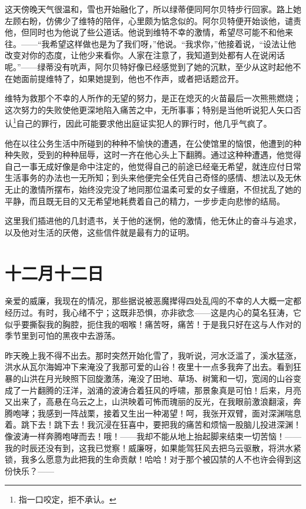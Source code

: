 \documentclass[12pt,oneside]{book}
\begin{document}
\begin{framed}
这天傍晚天气很温和，雪也开始融化了，所以绿蒂便同阿尔贝特步行回家。路上她左顾右盼，仿佛少了维特的陪伴，心里颇为惦念似的。阿尔贝特便开始谈他，谴责他，但同时也为他说了些公道话。他说到维特不幸的激情，希望尽可能不和他来往。——“我希望这样做也是为了我们呀，”他说。“我求你，”他接着说，“设法让他改变对你的态度，让他少来看你。人家在注意了，我知道到处都有人在说闲话呢。”——绿蒂没有吭声，阿尔贝特好像已经感觉到了她的沉默，至少从这时起他不在她面前提维特了，如果她提到，他也不作声，或者把话题岔开。

维特为救那个不幸的人所作的无望的努力，是正在熄灭的火苗最后一次熊熊燃烧；这次努力的失败使他更深地陷入痛苦之中，无所事事；特别是当他听说犯人矢口否认\footnote{指一口咬定，拒不承认。}自己的罪行，因此可能要求他出庭证实犯人的罪行时，他几乎气疯了。

他在以往公务生活中所碰到的种种不愉快的遭遇，在公使馆里的恼恨，他遭到的种种失败，受到的种种屈辱，这时一齐在他心头上下翻腾。通过这种种遭遇，他觉得自己一事无成好像是命中注定的，他觉得自己的前途已经毫无希望，就连应付日常生活事务的办法也一无所知；到头来他便完全任凭自己奇怪的感情、想法以及无休无止的激情所摆布，始终没完没了地同那位温柔可爱的女子缠磨，不但扰乱了她的平静，而且既无目的又无希望地耗费着自己的精力，一步步走向悲惨的结局。

这里我们插进他的几封遗书，关于他的迷惘，他的激情，他无休止的奋斗与追求，以及他对生活的厌倦，这些信件就是最有力的证明。
　　
\end{framed}



\chapter{十二月十二日}
\label{sec-5-1}
亲爱的威廉，我现在的情况，那些据说被恶魔撵得四处乱闯的不幸的人大概一定都经历过。有时，我心绪不宁；这既非恐惧，亦非欲念——这是内心的莫名狂涛，它似乎要撕裂我的胸腔，扼住我的咽喉！痛苦呀，痛苦！于是我只好在这与人作对的季节里到可怕的黑夜中去游荡。

昨天晚上我不得不出去。那时突然开始化雪了，我听说，河水泛滥了，溪水猛涨，洪水从瓦尔海姆冲下来淹没了我那可爱的山谷！夜里十一点多我奔了出去。看到狂暴的山洪在月光映照下回旋激荡，淹没了田地、草场、树篱和一切，宽阔的山谷变成了一片翻腾的汪洋，汹涌的波涛合着狂风的呼啸，那景象真是可怕！后来，月亮又出来了，高悬在乌云之上，山洪映着可怖而瑰丽的反光，在我眼前激浪翻滚，奔腾咆哮；我感到一阵战栗，接着又生出一种渴望！呵，我张开双臂，面对深渊喘息着。跳下去！跳下去！我沉浸在狂喜中，要把我的痛苦和烦恼一股脑儿投进深渊！像波涛一样奔腾咆哮而去！哦！——我却不能从地上抬起脚来结束一切苦恼！——我的时辰还没有到，这我已觉察！威廉呀，如果能驾狂风去把乌云驱散，将洪水紧锁，我多么愿意为此把我的生命贡献！哈哈！对于那个被囚禁的人不也许会得到这份快乐？——
\end{document}
